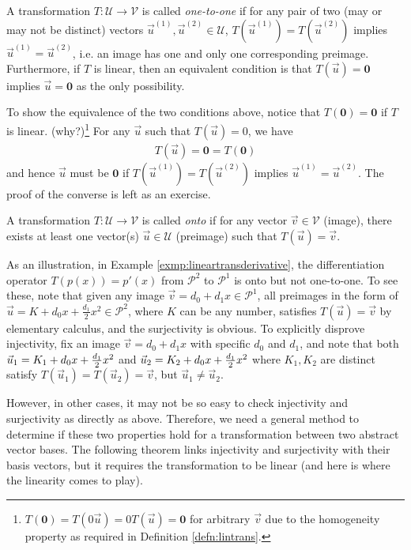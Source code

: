 \begin{defn}
\label{defn:injective}
A transformation $T: \mathcal{U} \to \mathcal{V}$ is called \textit{one-to-one} if for any pair of two (may or may not be distinct) vectors $\vec{u}^{(1)}, \vec{u}^{(2)} \in \mathcal{U}$, $T(\vec{u}^{(1)}) = T(\vec{u}^{(2)})$ implies $\vec{u}^{(1)} = \vec{u}^{(2)}$, i.e. an image has one and only one corresponding preimage. Furthermore, if $T$ is linear, then an equivalent condition is that $T(\vec{u}) = \textbf{0}$ implies $\vec{u} = \textbf{0}$ as the only possibility.
\end{defn}
To show the equivalence of the two conditions above, notice that $T(\textbf{0}) = \textbf{0}$ if $T$ is linear. (why?)\footnote{$T(\textbf{0})=T(0\vec{u})=0T(\vec{u})=\textbf{0}$ for arbitrary $\vec{v}$ due to the homogeneity property as required in Definition \ref{defn:lintrans}.} For any $\vec{u}$ such that $T(\vec{u}) = 0$, we have
\begin{align*}
T(\vec{u}) = \textbf{0} = T(\textbf{0})
\end{align*}
and hence $\vec{u}$ must be $\textbf{0}$ if $T(\vec{u}^{(1)}) = T(\vec{u}^{(2)})$ implies $\vec{u}^{(1)} = \vec{u}^{(2)}$. The proof of the converse is left as an exercise.
\begin{defn}
\label{defn:surjective}
A transformation $T: \mathcal{U} \to \mathcal{V}$ is called \textit{onto} if for any vector $\vec{v} \in \mathcal{V}$ (image), there exists at least one vector(s) $\vec{u} \in \mathcal{U}$ (preimage) such that $T(\vec{u}) = \vec{v}$.
\end{defn}
As an illustration, in Example \ref{exmp:lineartransderivative}, the differentiation operator $T(p(x)) = p'(x)$ from $\mathcal{P}^2$ to $\mathcal{P}^1$ is onto but not one-to-one. To see these, note that given any image $\vec{v} = d_0 + d_1x \in \mathcal{P}^1$, all preimages in the form of $\vec{u} = K + d_0x + \frac{d_1}{2}x^2\in \mathcal{P}^2$, where $K$ can be any number, satisfies $T(\vec{u}) = \vec{v}$ by elementary calculus, and the surjectivity is obvious. To explicitly disprove injectivity, fix an image $\vec{v} = d_0 + d_1x$ with specific $d_0$ and $d_1$, and note that both $\vec{u}_1 = K_1 + d_0x + \smash{\frac{d_1}{2}}x^2$ and $\vec{u}_2 = K_2 + d_0x + \smash{\frac{d_1}{2}}x^2$ where $K_1, K_2$ are distinct satisfy $T(\vec{u}_1) = T(\vec{u}_2) = \vec{v}$, but $\vec{u}_1 \neq \vec{u}_2$.

However, in other cases, it may not be so easy to check injectivity and surjectivity as directly as above. Therefore, we need a general method to determine if these two properties hold for a transformation between two abstract vector bases. The following theorem links injectivity and surjectivity with their basis vectors, but it requires the transformation to be linear (and here is where the linearity comes to play).


